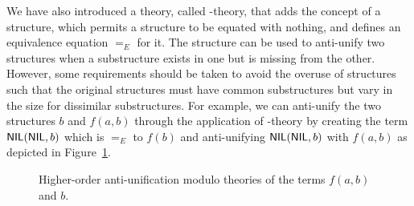 We have also introduced a theory, called \NIL{}-theory, that adds the concept of a \NIL{} structure, which permits a structure to be equated with nothing, and defines an equivalence equation $=_E$ for it. The \NIL{} structure can be used to anti-unify two structures when a substructure exists in one but is missing from the other. However, some requirements should be taken to avoid the overuse of \NIL{} structures such that the original structures must have common substructures but vary in the size for dissimilar substructures. For example, we can anti-unify the two structures $b$ and $f(a,b)$ through the application of \NIL{}-theory by creating the term $\textsf{NIL}(\textsf{NIL},b)$ which is $=_E$ to $f(b)$ and anti-unifying $\textsf{NIL}(\textsf{NIL},b)$ with $f(a,b)$ as depicted in Figure~\ref{fig:anti-nil}.


\begin{figure}[t]
\centering{}
\caption{Higher-order anti-unification modulo theories of the terms $f(a, b)$ and $b$.\label{fig:anti-nil}}
\end{figure}


